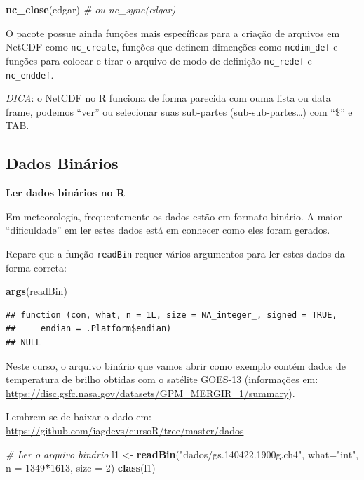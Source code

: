 \documentclass[]{book}
\newenvironment{Shaded}{\begin{snugshade}}{\end{snugshade}}
\newcommand{\KeywordTok}[1]{\textcolor[rgb]{0.13,0.29,0.53}{\textbf{#1}}}
\newcommand{\DataTypeTok}[1]{\textcolor[rgb]{0.13,0.29,0.53}{#1}}
\newcommand{\DecValTok}[1]{\textcolor[rgb]{0.00,0.00,0.81}{#1}}
\newcommand{\StringTok}[1]{\textcolor[rgb]{0.31,0.60,0.02}{#1}}
\newcommand{\CommentTok}[1]{\textcolor[rgb]{0.56,0.35,0.01}{\textit{#1}}}
\newcommand{\OperatorTok}[1]{\textcolor[rgb]{0.81,0.36,0.00}{\textbf{#1}}}
\newcommand{\NormalTok}[1]{#1}
\theoremstyle{definition}
\theoremstyle{definition}
\theoremstyle{definition}
\theoremstyle{remark}
\begin{document}
\begin{Shaded}
\begin{Highlighting}[]
\KeywordTok{nc_close}\NormalTok{(edgar) }\CommentTok{# ou nc_sync(edgar)}
\end{Highlighting}
\end{Shaded}

O pacote possue ainda funções mais específicas para a criação de
arquivos em NetCDF como \texttt{nc\_create}, funções que definem
dimenções como \texttt{ncdim\_def} e funções para colocar e tirar o
arquivo de modo de definição \texttt{nc\_redef} e \texttt{nc\_enddef}.

\emph{DICA}: o NetCDF no R funciona de forma parecida com ouma lista ou
data frame, podemos ``ver'' ou selecionar suas sub-partes
(sub-sub-partes\ldots{}) com ``\$'' e TAB.

\subsection{Dados Binários}\label{dados-binarios}

\textbf{Ler dados binários no R}

Em meteorologia, frequentemente os dados estão em formato binário. A
maior ``dificuldade'' em ler estes dados está em conhecer como eles
foram gerados.

Repare que a função \texttt{readBin} requer vários argumentos para ler
estes dados da forma correta:

\begin{Shaded}
\begin{Highlighting}[]
\KeywordTok{args}\NormalTok{(readBin)}
\end{Highlighting}
\end{Shaded}

\begin{verbatim}
## function (con, what, n = 1L, size = NA_integer_, signed = TRUE, 
##     endian = .Platform$endian) 
## NULL
\end{verbatim}

Neste curso, o arquivo binário que vamos abrir como exemplo contém dados
de temperatura de brilho obtidas com o satélite GOES-13 (informações em:
\url{https://disc.gsfc.nasa.gov/datasets/GPM_MERGIR_1/summary}).

Lembrem-se de baixar o dado em:
\url{https://github.com/iagdevs/cursoR/tree/master/dados}

\begin{Shaded}
\begin{Highlighting}[]
\CommentTok{# Ler o arquivo binário}
\NormalTok{l1 <-}\StringTok{ }\KeywordTok{readBin}\NormalTok{(}\StringTok{"dados/gs.140422.1900g.ch4"}\NormalTok{, }
              \DataTypeTok{what=}\StringTok{"int"}\NormalTok{, }
              \DataTypeTok{n =} \DecValTok{1349}\OperatorTok{*}\DecValTok{1613}\NormalTok{,}
              \DataTypeTok{size =} \DecValTok{2}\NormalTok{)}
\KeywordTok{class}\NormalTok{(l1)}
\end{Highlighting}
\end{Shaded}
\end{document}
